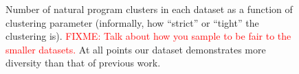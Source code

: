 \documentclass[conference]{IEEEtran}
\newcommand{\fixme}[1]{\textcolor{red}{FIXME: #1}}
\begin{document}


\begin{figure}
\caption{Number of natural program clusters in each dataset as a function
of clustering parameter (informally, how ``strict'' or ``tight'' the
clustering is). \fixme{Talk about how you sample to be fair to the smaller
datasets.} At all points our dataset demonstrates more diversity than
that of previous work.}
\label{fig-diversity}
\end{figure}
\end{document}
